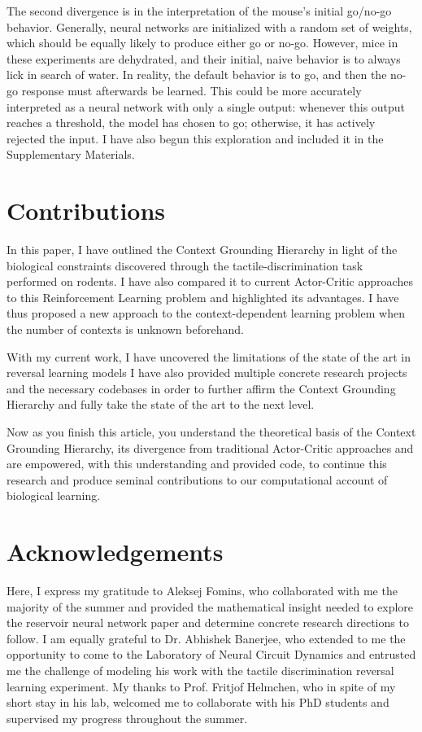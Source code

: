 \documentclass[11pt]{article}
\begin{document}
The second divergence is in the interpretation of the mouse's initial go/no-go behavior.  Generally, neural networks are initialized with a random set of weights, which should be equally likely to produce either go or no-go.  However, mice in these experiments are dehydrated, and their initial, naive behavior is to always lick in search of water.  In reality, the default behavior is to go, and then the no-go response must afterwards be learned.  This could be more accurately interpreted as a neural network with only a single output: whenever this output reaches a threshold, the model has chosen to go; otherwise, it has actively rejected the input.  I have also begun this exploration and included it in the Supplementary Materials.

\section{Contributions}
In this paper, I have outlined the Context Grounding Hierarchy in light of the biological constraints discovered through the tactile-discrimination task performed on rodents.  I have also compared it to current Actor-Critic approaches to this Reinforcement Learning problem and highlighted its advantages.  I have thus proposed a new approach to the context-dependent learning problem when the number of contexts is unknown beforehand.

With my current work, I have uncovered the limitations of the state of the art in reversal learning models  I have also provided multiple concrete research projects and the necessary codebases in order to further affirm the Context Grounding Hierarchy and fully take the state of the art to the next level.

Now as you finish this article, you understand the theoretical basis of the Context Grounding Hierarchy, its divergence from traditional Actor-Critic approaches and are empowered, with this understanding and provided code, to continue this research and produce seminal contributions to our computational account of biological learning.

\newpage
\section{Acknowledgements}

Here, I express my gratitude to Aleksej Fomins, who collaborated with me the majority of the summer and provided the mathematical insight needed to explore the reservoir neural network paper and determine concrete research directions to follow.  I am equally grateful to Dr. Abhishek Banerjee, who extended to me the opportunity to come to the Laboratory of Neural Circuit Dynamics and entrusted me the challenge of modeling his work with the tactile discrimination reversal learning experiment.  My thanks to Prof. Fritjof Helmchen, who in spite of my short stay in his lab, welcomed me to collaborate with his PhD students and supervised my progress throughout the summer.
\end{document}
